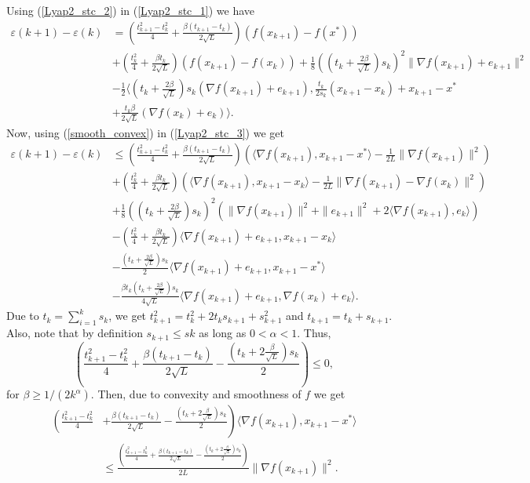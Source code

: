 \documentclass{article}
\theoremstyle{plain}
\theoremstyle{definition}
\theoremstyle{remark}
\begin{document}
    Using (\ref{Lyap2_stc_2}) in (\ref{Lyap2_stc_1}) we have
    \begin{align}\label{Lyap2_stc_3}
        \varepsilon(k+1)-\varepsilon(k)&=(\frac{t_{k+1}^2-t_k^2}{4}+\frac{\beta(t_{k+1}-t_k)}{2\sqrt{L}})(f(x_{k+1})-f(x^*))\nonumber\\
        &+(\frac{t_{k}^2}{4}+\frac{\beta t_{k}}{2\sqrt{L}})(f(x_{k+1})-f(x_k))+\frac{1}{8}((t_k+\frac{2\beta}{\sqrt{L}})s_k)^2\|\nabla f(x_{k+1})+e_{k+1}\|^2\nonumber\\
        &-\frac{1}{2}\langle (t_k+\frac{2\beta}{\sqrt{L}})s_k (\nabla f(x_{k+1})+e_{k+1}), \frac{t_k}{2s_k}(x_{k+1}-x_k)+x_{k+1}-x^*\nonumber\\
        &+\frac{t_k\beta}{2\sqrt{L}}(\nabla f(x_k)+e_k)\rangle.
    \end{align}
    Now, using (\ref{smooth_convex}) in (\ref{Lyap2_stc_3}) we get
    \begin{align}\label{Lyap2_stc_4}
         \varepsilon(k+1)-\varepsilon(k)&\leq (\frac{t_{k+1}^2-t_k^2}{4}+\frac{\beta(t_{k+1}-t_k)}{2\sqrt{L}})(\langle \nabla f(x_{k+1}),x_{k+1}-x^* \rangle-\frac{1}{2L}\|\nabla f(x_{k+1})\|^2)\nonumber\\
         & +(\frac{t_{k}^2}{4}+\frac{\beta t_{k}}{2\sqrt{L}})(\langle \nabla f(x_{k+1}),x_{k+1}-x_k \rangle-\frac{1}{2L}\|\nabla f(x_{k+1})-\nabla f(x_k)\|^2)\nonumber\\
         & +\frac{1}{8}((t_k+\frac{2\beta}{\sqrt{L}})s_k)^2(\|\nabla f(x_{k+1})\|^2+\|e_{k+1}\|^2+2\langle \nabla f(x_{k+1}) ,e_k \rangle) \nonumber\\
         & -(\frac{t_k^2}{4}+\frac{\beta t_k}{2\sqrt{L}})\langle \nabla f(x_{k+1})+e_{k+1},x_{k+1}-x_k\rangle\nonumber\\
         &-\frac{(t_k+\tfrac{2\beta}{\sqrt{L}})s_k}{2}\langle \nabla f(x_{k+1})+e_{k+1},x_{k+1}-x^*\rangle\nonumber\\
         & -\frac{\beta t_k(t_k+\frac{2\beta}{\sqrt{L}})s_k}{4\sqrt{L}}\langle \nabla f(x_{k+1})+e_{k+1}, \nabla f(x_k)+e_k \rangle.
         \end{align}
          Due to $t_k=\sum_{i=1}^k s_k$, we get $t_{k+1}^2=t_k^2 + 2t_ks_{k+1}+ s_{k+1}^2$ and $t_{k+1}=t_k+s_{k+1}$. Also, note  that by definition $s_{k+1}\leq s{k}$ as long as $0<\alpha<1$. Thus,
         $$\left(\frac{t_{k+1}^2-t_k^2}{4}+\frac{\beta (t_{k+1}-t_k)}{2\sqrt{L}} -\frac{(t_k+2\frac{\beta}{\sqrt{L}})s_k}{2}\right)\leq 0,$$
         for $\beta \geq 1/(2k^\alpha)$.
         Then, due to convexity and smoothness of $f$ we get
         \begin{align}\label{Lyap2_stc_5}
             \left(\frac{t_{k+1}^2-t_k^2}{4}\right. & \left. +\frac{\beta (t_{k+1}-t_k)}{2\sqrt{L}} -\frac{(t_k+2\frac{\beta}{\sqrt{L}})s_k}{2}\right)\langle \nabla f(x_{k+1}), x_{k+1}-x^* \rangle\nonumber\\
             &\leq \frac{\left(\frac{t_{k+1}^2-t_k^2}{4}+\frac{\beta (t_{k+1}-t_k)}{2\sqrt{L}} -\frac{(t_k+2\frac{\beta}{\sqrt{L}})s_k}{2}\right)}{2L}\|\nabla f(x_{k+1})\|^2.
         \end{align} 
\end{document}
